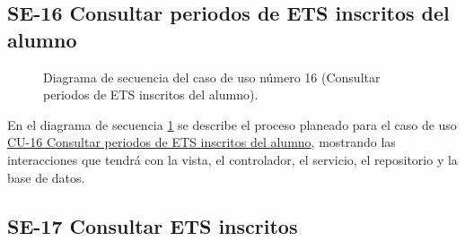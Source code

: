 \subsection{SE-16 Consultar periodos de ETS inscritos del alumno}

\begin{figure}[htbp!]
	\begin{center}
		\caption{Diagrama de secuencia del caso de uso número 16 (Consultar periodos de ETS inscritos del alumno).}
		\label{fig:Diagrama de secuencia CU-16}
	\end{center}
\end{figure}

En el diagrama de secuencia \ref{fig:Diagrama de secuencia CU-16} se describe el proceso planeado para el caso de uso \hyperlink{CU-16}{CU-16 Consultar periodos de ETS inscritos del alumno}, mostrando las interacciones que tendrá con la vista, el controlador, el servicio, el repositorio y la base de datos.

\newpage

\subsection{SE-17 Consultar ETS inscritos}

